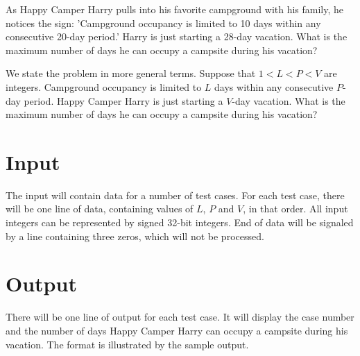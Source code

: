 

As Happy Camper Harry pulls into his favorite campground with his family, he notices the sign: 'Campground occupancy is limited to 10 days within any consecutive 20-day period.' Harry is just starting a 28-day vacation. What is the maximum number of days he can occupy a campsite during his vacation?

We state the problem in more general terms. Suppose that $1 < L < P < V$ are integers. Campground occupancy is limited to $L$ days within any consecutive $P$-day period. Happy Camper Harry is just starting a $V$-day vacation. What is the maximum number of days he can occupy a campsite during his vacation?

\section*{Input}

      The input will contain data for a number of test cases. For each test case, there will be one line of data, containing values of $L$, $P$ and $V$, in that order. All input integers can be represented by signed 32-bit integers. End of data will be signaled by a line containing three zeros, which will not be processed.

\section*{Output}

There will be one line of output for each test case. It will display the case number and the number of days Happy Camper Harry can occupy a campsite during his vacation. The format is illustrated by the sample output.


